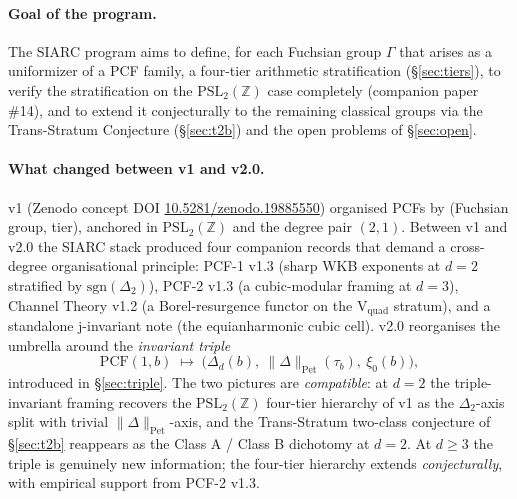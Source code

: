\documentclass[11pt,a4paper]{article}
\theoremstyle{definition}
\theoremstyle{remark}
\newcommand{\PSLZ}{\mathrm{PSL}_2(\mathbb{Z})}
\newcommand{\PCF}{\mathrm{PCF}}
\newcommand{\PetN}[1]{\lVert #1 \rVert_{\mathrm{Pet}}}
\begin{document}
\paragraph{Goal of the program.}
The SIARC program aims to define, for each Fuchsian group $\Gamma$ that
arises as a uniformizer of a PCF family, a four-tier arithmetic
stratification (\S\ref{sec:tiers}), to verify the stratification on the
$\PSLZ$ case completely (companion paper \#14), and to extend it
conjecturally to the remaining classical groups via the Trans-Stratum
Conjecture (\S\ref{sec:t2b}) and the open problems of \S\ref{sec:open}.

\paragraph{What changed between v1 and v2.0.}
\label{par:v1-to-v2}
v1 (Zenodo concept DOI \href{https://doi.org/10.5281/zenodo.19885550}{10.5281/zenodo.19885550})
organised PCFs by (Fuchsian group, tier), anchored in $\PSLZ$ and the
degree pair $(2,1)$. Between v1 and v2.0 the SIARC stack produced four
companion records that demand a cross-degree organisational principle:
PCF-1 v1.3 (sharp WKB exponents at $d=2$ stratified by $\mathrm{sgn}(\Delta_2)$),
PCF-2 v1.3 (a cubic-modular framing at $d=3$),
Channel Theory v1.2 (a Borel-resurgence functor on the V$_{\mathrm{quad}}$
stratum), and a standalone j-invariant note (the equianharmonic cubic
cell). v2.0 reorganises the umbrella around the \emph{invariant triple}
\begin{equation}
  \label{eq:invariant-triple}
  \PCF(1,b) \;\longmapsto\; \bigl(\Delta_d(b),\ \PetN{\Delta}(\tau_b),\ \xi_0(b)\bigr),
\end{equation}
introduced in \S\ref{sec:triple}. The two pictures are
\emph{compatible}: at $d=2$ the triple-invariant framing recovers the
$\PSLZ$ four-tier hierarchy of v1 as the $\Delta_2$-axis split with
trivial $\PetN{\Delta}$-axis, and the Trans-Stratum two-class
conjecture of \S\ref{sec:t2b} reappears as the Class A / Class B
dichotomy at $d=2$. At $d \geq 3$ the triple is genuinely new
information; the four-tier hierarchy extends \emph{conjecturally},
with empirical support from PCF-2 v1.3.
\end{document}
